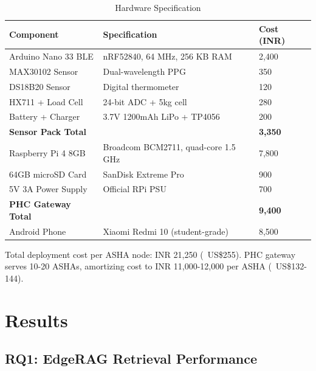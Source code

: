 \documentclass[conference,compsoc]{IEEEtran}
\begin{document}
\begin{table}[h]
\centering
\caption{Hardware Specification}
\label{tab:hardware}
\footnotesize
\begin{tabular}{@{}lll@{}}
\toprule
\textbf{Component} & \textbf{Specification} & \textbf{Cost (INR)} \\ \midrule
Arduino Nano 33 BLE & nRF52840, 64 MHz, 256 KB RAM & 2,400 \\
MAX30102 Sensor & Dual-wavelength PPG & 350 \\
DS18B20 Sensor & Digital thermometer & 120 \\
HX711 + Load Cell & 24-bit ADC + 5kg cell & 280 \\
Battery + Charger & 3.7V 1200mAh LiPo + TP4056 & 200 \\
\midrule
\textbf{Sensor Pack Total} & & \textbf{3,350} \\
\midrule
Raspberry Pi 4 8GB & Broadcom BCM2711, quad-core 1.5 GHz & 7,800 \\
64GB microSD Card & SanDisk Extreme Pro & 900 \\
5V 3A Power Supply & Official RPi PSU & 700 \\
\midrule
\textbf{PHC Gateway Total} & & \textbf{9,400} \\
\midrule
Android Phone & Xiaomi Redmi 10 (student-grade) & 8,500 \\
\bottomrule
\end{tabular}
\end{table}

Total deployment cost per ASHA node: INR 21,250 (~US\$255). PHC gateway serves 10-20 ASHAs, amortizing cost to INR 11,000-12,000 per ASHA (~US\$132-144).

\section{Results}

\subsection{RQ1: EdgeRAG Retrieval Performance}
\end{document}
